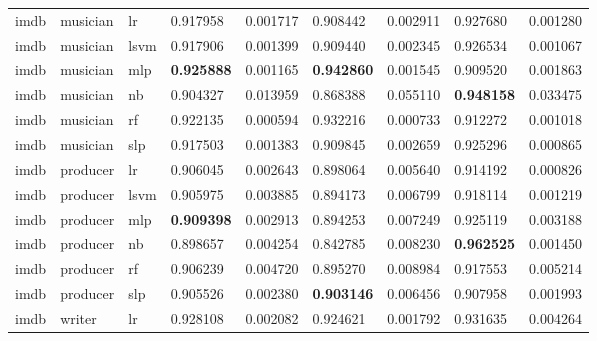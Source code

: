 \documentclass[epsfig,a4paper,11pt,titlepage,twoside,openany]{book}
\begin{document}
\begin{longtable}{|l|l|l|l|l|l|l|l|l|}
imdb        & musician & lr    & 0.917958                           & 0.001717 & 0.908442                           & 0.002911 & 0.927680                           & 0.001280 \\
imdb        & musician & lsvm  & 0.917906                           & 0.001399 & 0.909440                           & 0.002345 & 0.926534                           & 0.001067 \\
imdb        & musician & mlp   & \textbf{0.925888} & 0.001165 & \textbf{0.942860} & 0.001545 & 0.909520                           & 0.001863 \\
imdb        & musician & nb    & 0.904327                           & 0.013959 & 0.868388                           & 0.055110 & \textbf{0.948158} & 0.033475 \\
imdb        & musician & rf    & 0.922135                           & 0.000594 & 0.932216                           & 0.000733 & 0.912272                           & 0.001018 \\
imdb        & musician & slp   & 0.917503                           & 0.001383 & 0.909845                           & 0.002659 & 0.925296                           & 0.000865 \\ \hline
imdb        & producer & lr    & 0.906045                           & 0.002643 & 0.898064                           & 0.005640 & 0.914192                           & 0.000826 \\
imdb        & producer & lsvm  & 0.905975                           & 0.003885 & 0.894173                           & 0.006799 & 0.918114                           & 0.001219 \\
imdb        & producer & mlp   & \textbf{0.909398} & 0.002913 & 0.894253                           & 0.007249 & 0.925119                           & 0.003188 \\
imdb        & producer & nb    & 0.898657                           & 0.004254 & 0.842785                           & 0.008230 & \textbf{0.962525} & 0.001450 \\
imdb        & producer & rf    & 0.906239                           & 0.004720 & 0.895270                           & 0.008984 & 0.917553                           & 0.005214 \\
imdb        & producer & slp   & 0.905526                           & 0.002380 & \textbf{0.903146} & 0.006456 & 0.907958                           & 0.001993 \\ \cline{2-9} 
imdb        & writer   & lr    & 0.928108                           & 0.002082 & 0.924621                           & 0.001792 & 0.931635                           & 0.004264 \\

\end{longtable}
\end{document}
